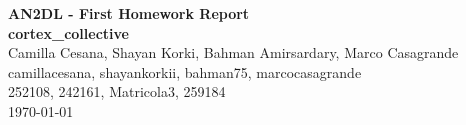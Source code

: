 \documentclass[11pt]{article}
\begin{document}
    \begin{center}
        {\Large \textbf{AN2DL - First Homework Report}}\\
        \vspace{2mm}
        {\Large \textbf{cortex\_collective}}\\
        \vspace{2mm}
        {\large Camilla Cesana,}
        {\large Shayan Korki,}
        {\large Bahman Amirsardary,}
        {\large Marco Casagrande }\\
        \vspace{2mm}
        {camillacesana,}
        {shayankorkii,}
        {bahman75,}
        {marcocasagrande}\\
        \vspace{2mm}
        {252108,}
        {242161,}
        {Matricola3,}
        {259184}\\
        \vspace{5mm}
        \today
    \end{center}    
    \vspace{5mm}
\end{document}
